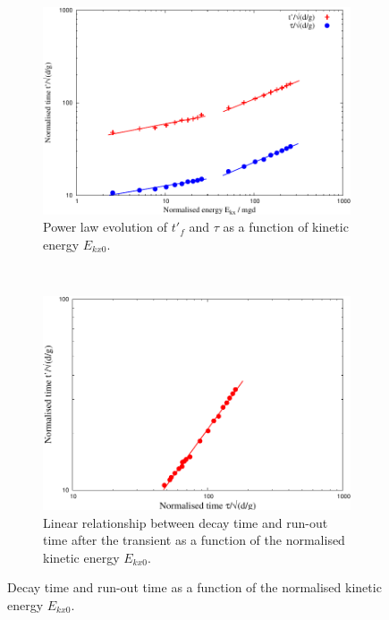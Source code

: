 \begin{figure}[tbhp]
\centering
\begin{subfigure}[b]{0.975\textwidth}
\includegraphics[width=\textwidth]{tp_tau_mgd}
\caption{Power law evolution of $t'_f$ and $\tau$ as a function of kinetic 
energy $E_{kx0}$.}
\label{fig:tp_tau_mgd}
\end{subfigure}
\\
\begin{subfigure}[b]{0.975\textwidth}
\centering
\includegraphics[width=\textwidth]{tpTau}
\caption{Linear relationship between decay time and run-out time after the 
transient as a function of the normalised kinetic energy $E_{kx0}$.}
\label{fig:tpTau}
\end{subfigure}
\caption{Decay time and run-out time as a function of the normalised kinetic 
energy $E_{kx0}$.}
\label{fig:tp_Tau}
\end{figure}


